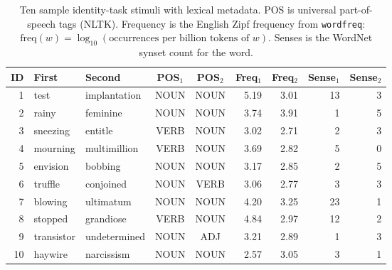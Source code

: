 \begin{table}[h]
\centering
\footnotesize
\renewcommand{\arraystretch}{1.08}
\begin{tabular}{rllccrrrr}
\toprule
ID & First & Second & POS$_1$ & POS$_2$ & Freq$_1$ & Freq$_2$ & Sense$_1$ & Sense$_2$ \\
\midrule
1 & test & implantation & NOUN & NOUN & 5.19 & 3.01 & 13 & 3 \\
2 & rainy & feminine & NOUN & NOUN & 3.74 & 3.91 & 1 & 5 \\
3 & sneezing & entitle & VERB & NOUN & 3.02 & 2.71 & 2 & 3 \\
4 & mourning & multimillion & VERB & NOUN & 3.69 & 2.82 & 5 & 0 \\
5 & envision & bobbing & NOUN & NOUN & 3.17 & 2.85 & 2 & 5 \\
6 & truffle & conjoined & NOUN & VERB & 3.06 & 2.77 & 3 & 3 \\
7 & blowing & ultimatum & NOUN & NOUN & 4.20 & 3.25 & 23 & 1 \\
8 & stopped & grandiose & VERB & NOUN & 4.84 & 2.97 & 12 & 2 \\
9 & transistor & undetermined & NOUN & ADJ & 3.21 & 2.89 & 1 & 3 \\
10 & haywire & narcissism & NOUN & NOUN & 2.57 & 3.05 & 3 & 1 \\
\bottomrule
\end{tabular}
\caption{Ten sample identity-task stimuli with lexical metadata. POS is universal part-of-speech tags (NLTK). Frequency is the English Zipf frequency from \texttt{wordfreq}: $\mathrm{freq}(w)=\log_{10}(\text{occurrences per billion tokens of }w)$. Senses is the WordNet synset count for the word.}
\label{tab:appendix_identity_samples_metadata}
\end{table}
